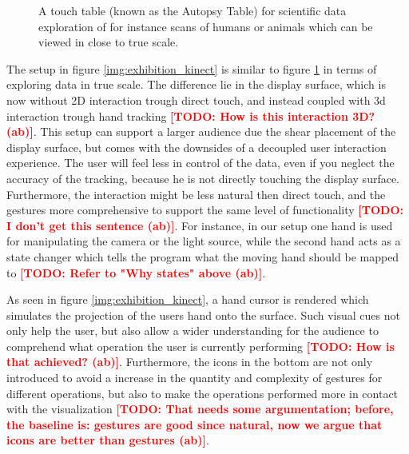\documentclass[review,journal]{vgtc}         %
\newcommand{\todo}[1]{\textbf{\textcolor{red}{[TODO: {#1}]}}}
\begin{document}
\begin{figure}[htb]
	\centering
	\caption{A touch table (known as the Autopsy Table) for scientific data exploration of for instance scans of humans or animals which can be viewed in close to true scale.}
	\label{img:exhibition_table}
\end{figure}

The setup in figure \ref{img:exhibition_kinect} is similar to figure \ref{img:exhibition_table} in terms of exploring data in true scale. The difference lie in the display surface, which is now without 2D interaction trough direct touch, and instead coupled with 3d interaction trough hand tracking \todo{How is this interaction 3D? (ab)}. This setup can support a larger audience due the shear placement of the display surface, but comes with the downsides of a decoupled user interaction experience. The user will feel less in control of the data, even if you neglect the accuracy of the tracking, because he is not directly touching the display surface. Furthermore, the interaction might be less natural then direct touch, and the gestures more comprehensive to support the same level of functionality \todo{I don't get this sentence (ab)}. For instance, in our setup one hand is used for manipulating the camera or the light source, while the second hand acts as a state changer which tells the program what the moving hand should be mapped to \todo{Refer to "Why states" above (ab)}.

As seen in figure \ref{img:exhibition_kinect}, a hand cursor is rendered which simulates the projection of the users hand onto the surface. Such visual cues not only help the user, but also allow a wider understanding for the audience to comprehend what operation the user is currently performing \todo{How is that achieved? (ab)}. Furthermore, the icons in the bottom are not only introduced to avoid a increase in the quantity and complexity of gestures for different operations, but also to make the operations performed more in contact with the visualization \todo{That needs some argumentation; before, the baseline is: gestures are good since natural, now we argue that icons are better than gestures (ab)}.
\end{document}
